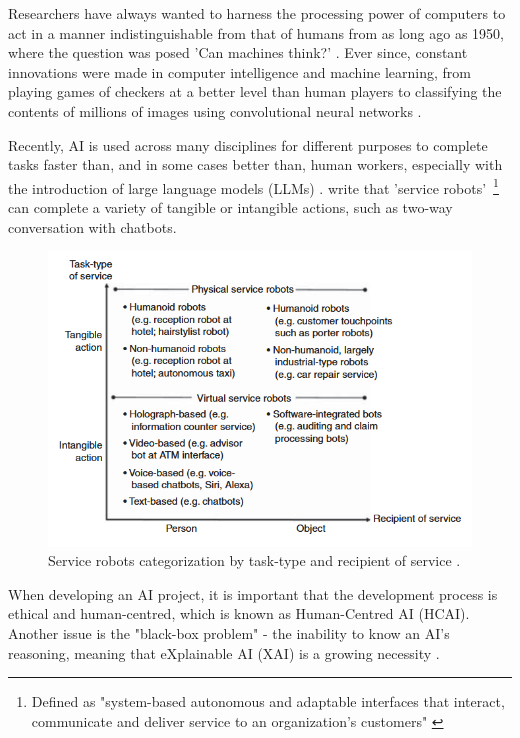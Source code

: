 \documentclass[12pt]{report}
\begin{document}
    Researchers have always wanted to harness the processing power of computers to act in a manner 
    indistinguishable from that of humans from as long ago as 1950, where the question was posed 
    'Can machines think?' \autocite{turing_icomputing_1950}. Ever since, constant innovations were made in computer 
    intelligence and machine learning, from playing games of checkers at a better level than human players \autocite{samuel_studies_1959}
    to classifying the contents of millions of images using convolutional neural networks \autocite{krizhevsky_imagenet_2012}.

    Recently, AI is used across many disciplines for different purposes to complete tasks faster than, and in some cases better than,
    human workers, especially with the introduction of large language models (LLMs) \autocite{AIDigitalAssistants}. \textcite{wirtz_brave_2018} write that 'service robots'~\footnote{Defined as "system-based autonomous and adaptable interfaces that 
    interact, communicate and deliver service to an organization’s customers" \autocite[p.909]{wirtz_brave_2018}} can complete a variety of 
    tangible or intangible actions, such as two-way conversation with chatbots.
    
    \begin{figure}[H]
        \centering
        \includegraphics[width=.8\linewidth]{serviceBots.png}
        \caption{Service robots categorization by task-type and recipient of service \autocite{wirtz_brave_2018}.}
        \label{fig:serviceBots}
    \end{figure}

    When developing an AI project, it is important that the development process
    is ethical and human-centred, which is known as Human-Centred AI (HCAI). 
    Another issue is the "black-box problem" - the inability to know an AI's reasoning, meaning that 
    eXplainable AI (XAI) is a growing necessity \autocite{miro-nicolau_comprehensive_2025}. 
    
\end{document}

